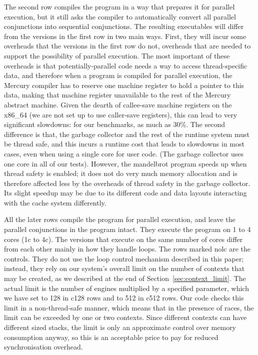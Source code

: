The second row
compiles the program in a way that prepares it for parallel execution,
but it still asks the compiler to automatically convert
all parallel conjunctions into sequential conjunctions.
The resulting executables will differ from the versions in the first row
in two main ways.
First, they will incur some overheads
that the versions in the first row do not,
overheads that are needed to support the possibility of parallel execution.
The most important of these overheads is that
potentially-parallel code needs a way to access thread-specific data,
and therefore when a program is compiled for parallel execution,
the Mercury compiler has to reserve one machine register
to hold a pointer to this data,
making that machine register unavailable
to the rest of the Mercury abstract machine.
Given the dearth of callee-save machine registers on the x86\_64
(we are not set up to use caller-save registers),
this can lead to very significant slowdowns:
for our benchmarks, as much as 30\%.
The second difference is that,
the garbage collector and the rest of the runtime system
must be thread safe,
and this incurs a runtime cost that leads to slowdowns in most cases,
even when using a single core for user code.
(The garbage collector uses one core in all of our tests).
However, the mandelbrot program speeds up when thread safety is enabled;
it does not do very much memory allocation
and is therefore affected less by
the overheads of thread safety in the garbage collector.
Its slight speedup may be due to
its different code and data layouts
interacting with the cache system differently.

All the later rows
compile the program for parallel execution,
and leave the parallel conjunctions in the program intact.
They execute the program on 1 to 4 cores (1c to 4c).
The versions that execute on the same number of cores
differ from each other mainly in how they handle loops.
The rows marked nolc are the controls.
They do not use the loop control mechanism described in this paper;
instead, they rely on our system's overall limit
on the number of contexts that may be created,
as we described at the end of Section~\ref{sec:context_limit}.
The actual limit is the number of engines
multiplied by a specified parameter,
which we have set to 128 in c128 rows and to 512 in c512 rows.
Our code checks this limit in a non-thread-safe manner,
which means that in the presence of races,
the limit can be exceeded by one or two contexts.
Since different contexts can have different sized stacks,
the limit is only an approximate control over memory consumption anyway,
so this is an acceptable price to pay for reduced synchronisation overhead.

